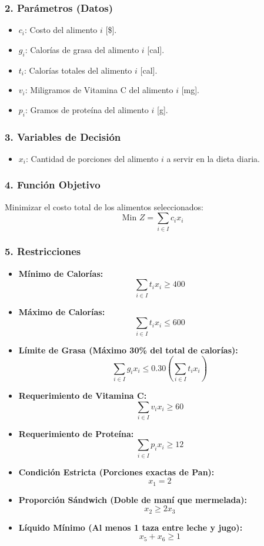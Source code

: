\documentclass{article}
\begin{document}
	\subsubsection*{2. Parámetros (Datos)}
	\begin{itemize}
		\item $c_i$: Costo del alimento $i$ [\$].
		\item $g_i$: Calorías de grasa del alimento $i$ [cal].
		\item $t_i$: Calorías totales del alimento $i$ [cal].
		\item $v_i$: Miligramos de Vitamina C del alimento $i$ [mg].
		\item $p_i$: Gramos de proteína del alimento $i$ [g].
	\end{itemize}
	
	\subsubsection*{3. Variables de Decisión}
	\begin{itemize}
		\item $x_i$: Cantidad de porciones del alimento $i$ a servir en la dieta diaria.
	\end{itemize}
	
	\subsubsection*{4. Función Objetivo}
	Minimizar el costo total de los alimentos seleccionados:
	$$ \text{Min } Z = \sum_{i \in I} c_i x_i $$
	
	\subsubsection*{5. Restricciones}
	\begin{itemize}
		\item \textbf{Mínimo de Calorías:}
		$$ \sum_{i \in I} t_i x_i \geq 400 $$
		
		\item \textbf{Máximo de Calorías:}
		$$ \sum_{i \in I} t_i x_i \leq 600 $$
		
		\item \textbf{Límite de Grasa (Máximo 30\% del total de calorías):}
		$$ \sum_{i \in I} g_i x_i \leq 0.30 \left( \sum_{i \in I} t_i x_i \right) $$
		
		\item \textbf{Requerimiento de Vitamina C:}
		$$ \sum_{i \in I} v_i x_i \geq 60 $$
		
		\item \textbf{Requerimiento de Proteína:}
		$$ \sum_{i \in I} p_i x_i \geq 12 $$
		
		\item \textbf{Condición Estricta (Porciones exactas de Pan):}
		$$ x_1 = 2 $$
		
		\item \textbf{Proporción Sándwich (Doble de maní que mermelada):}
		$$ x_2 \geq 2 x_3 $$
		
		\item \textbf{Líquido Mínimo (Al menos 1 taza entre leche y jugo):}
		$$ x_5 + x_6 \geq 1 $$
	\end{itemize}
	
\end{document}
